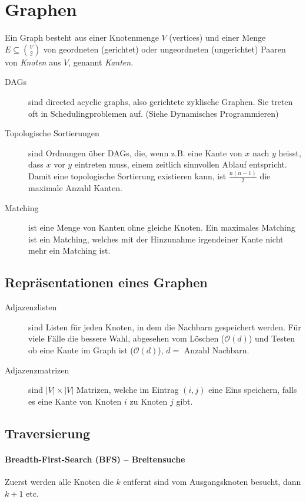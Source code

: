 \documentclass[a4paper, 9pt, DIV=20]{scrartcl}
\newcommand{\Oh}{\mathcal{O}}
\begin{document}
\section{Graphen}
Ein Graph besteht aus einer Knotenmenge $V$ (vertices) und einer Menge $E \subseteq {V \choose 2}$ von geordneten (gerichtet) oder ungeordneten (ungerichtet) Paaren von \emph{Knoten} aus $V$, genannt \emph{Kanten}.
\begin{description}
\item[DAGs] sind directed acyclic graphs, also gerichtete zyklische Graphen. Sie treten oft in Schedulingproblemen auf. (Siehe Dynamisches Programmieren)
\item[Topologische Sortierungen] sind Ordnungen über DAGs, die, wenn z.B. eine Kante von $x$ nach $y$ heisst, dass $x$ vor $y$ eintreten muss, einem zeitlich sinnvollen Ablauf entspricht. Damit eine topologische Sortierung existieren kann, ist $\frac{n(n-1)}{2}$ die maximale Anzahl Kanten.
\item[Matching] ist eine Menge von Kanten ohne gleiche Knoten. Ein maximales Matching ist ein Matching, welches mit der Hinzunahme irgendeiner Kante nicht mehr ein Matching ist.
\end{description}

\subsection{Repräsentationen eines Graphen}
\begin{description}
\item[Adjazenzlisten] sind Listen für jeden Knoten, in dem die Nachbarn gespeichert werden. Für viele Fälle die bessere Wahl, abgesehen vom Löschen ($\Oh(d)$) und Testen ob eine Kante im Graph ist ($\Oh(d)$), $d=$ Anzahl Nachbarn.
\item[Adjazenzmatrizen] sind $|V|\times|V|$ Matrizen, welche im Eintrag $(i,j)$ eine Eins speichern, falls es eine Kante von Knoten $i$ zu Knoten $j$ gibt. 
\end{description}

\subsection{Traversierung}
\paragraph{Breadth-First-Search (BFS) -- Breitensuche} Zuerst werden alle Knoten die $k$ entfernt sind vom Ausgangsknoten besucht, dann $k+1$ etc.
\end{document}
